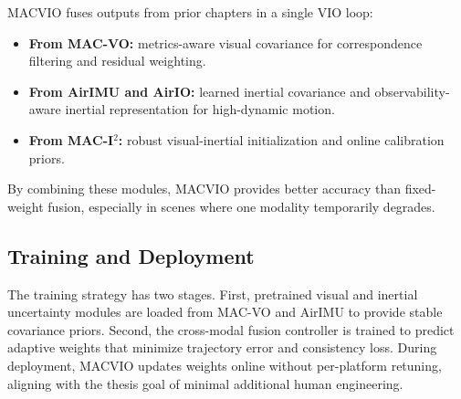 MACVIO fuses outputs from prior chapters in a single VIO loop:
\begin{itemize}
    \item \textbf{From MAC-VO:} metrics-aware visual covariance for correspondence filtering and residual weighting.
    \item \textbf{From AirIMU and AirIO:} learned inertial covariance and observability-aware inertial representation for high-dynamic motion.
    \item \textbf{From MAC-I$^2$:} robust visual-inertial initialization and online calibration priors.
\end{itemize}
By combining these modules, MACVIO provides better accuracy than fixed-weight fusion, especially in scenes where one modality temporarily degrades.

\subsection{Training and Deployment}

The training strategy has two stages.
First, pretrained visual and inertial uncertainty modules are loaded from MAC-VO and AirIMU to provide stable covariance priors.
Second, the cross-modal fusion controller is trained to predict adaptive weights that minimize trajectory error and consistency loss.
During deployment, MACVIO updates weights online without per-platform retuning, aligning with the thesis goal of minimal additional human engineering.
